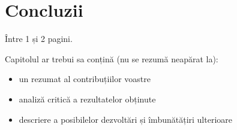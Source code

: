 \chapter{Concluzii}
\pagestyle{fancy}

{\noindent\color{blue} Între 1 și 2 pagini.\\}

Capitolul ar trebui sa conțină (nu se rezumă neapărat la):
\begin{itemize}
	\item un rezumat al contribuțiilor voastre
	\item analiză critică a rezultatelor obținute
	\item descriere a posibilelor dezvoltări și îmbunătățiri ulterioare
\end{itemize}


